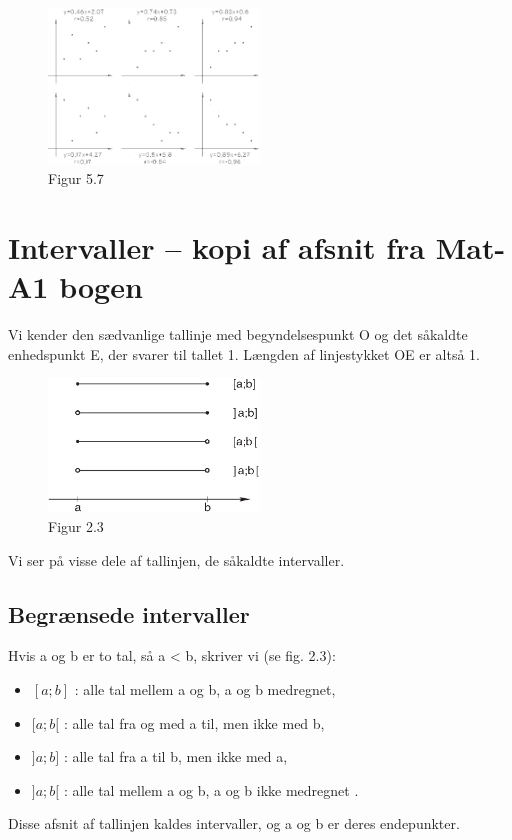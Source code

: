 \documentclass[12pt,oneside,a4paper]{article}
\begin{document}
\begin{figure}[ht]
    \centering
    \includegraphics[width=0.5\textwidth]{fig57}
    \caption{Figur 5.7}
    \label{fig57}
\end{figure}


\section{Intervaller -- kopi af afsnit fra Mat-A1 bogen}

Vi kender den sædvanlige tallinje med begyndelsespunkt O og det såkaldte
enhedspunkt E, der svarer til tallet 1. Længden af linjestykket OE er altså 1.

\begin{figure}[ht]
    \centering
    \includegraphics[width=0.5\textwidth]{fig23}
    \caption{Figur 2.3}
    \label{fig23}
\end{figure}

Vi ser på visse dele af tallinjen, de såkaldte intervaller.

\subsection{Begrænsede intervaller}
Hvis a og b er to tal, så a < b, skriver vi (se fig. 2.3):
\begin{itemize}
    \item $[a;b]$ : alle tal mellem a og b, a og b medregnet,
    \item $[a;b[$ : alle tal fra og med a til, men ikke med b,
    \item $]a;b]$ : alle tal fra a til b, men ikke med a,
    \item $]a;b[$ : alle tal mellem a og b, a og b ikke medregnet .
\end{itemize}
Disse afsnit af tallinjen kaldes intervaller, og a og b er deres endepunkter.
\end{document}

